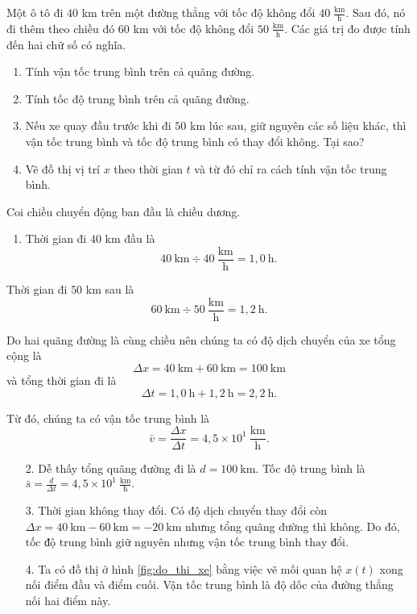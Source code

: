 \documentclass[a4paper, titlepage, openany]{book}
\newcounter{exercise}
\newcounter{solution}
\numberwithin{equation}{chapter}
\begin{document}
\exercise Một ô tô đi $40$ km trên một đường thẳng với tốc độ không đổi $40\;\frac{\text{km}}{\text{h}}$. Sau đó, nó đi thêm theo chiều đó $60$ km với tốc độ không đổi $50\;\frac{\text{km}}{\text{h}}$. Các giá trị đo được tính đến hai chữ số có nghĩa.
\begin{enumerate}
   \item Tính vận tốc trung bình trên cả quãng đường.
   \item Tính tốc độ trung bình trên cả quãng đường.
   \item Nếu xe quay đầu trước khi đi $50$ km lúc sau, giữ nguyên các số liệu khác, thì vận tốc trung bình và tốc độ trung bình có thay đổi không. Tại sao?
   \item Vẽ đồ thị vị trí $x$ theo thời gian $t$ và từ đó chỉ ra cách tính vận tốc trung bình.
\end{enumerate}
\solution

Coi chiều chuyển động ban đầu là chiều dương.

\begin{enumerate}
   \item Thời gian đi $40$ km đầu là $$40\ \text{km}\div 40\ \frac{\text{km}}{\text{h}}=1{,}0\ \text{h}.$$
\end{enumerate}

Thời gian đi $50$ km sau là $$60\ \text{km}\div 50\ \frac{\text{km}}{\text{h}}=1{,}2\ \text{h}.$$

Do hai quãng đường là cùng chiều nên chúng ta có độ dịch chuyển của xe tổng cộng là $$\Delta x=40\ \text{km} + 60\ \text{km} = 100\ \text{km}$$ và tổng thời gian đi là $$\Delta t =1{,}0\ \text{h}+1{,}2\ \text{h}=2{,}2\ \text{h}.$$

Từ đó, chúng ta có vận tốc trung bình là $$\bar{v} = \frac{\Delta x}{\Delta t} =\boxed{4{,}5\times10^1\ \frac{\text{km}}{\text{h}}}.$$

\begin{enumerate}
   \item[2.] Dễ thấy tổng quãng đường đi là $d=100\ \text{km}$. Tốc độ trung bình là $\bar{s} = \frac{d}{\Delta t}=\boxed{4{,}5\times10^1\ \frac{\text{km}}{\text{h}}}.$
   \item[3.] Thời gian không thay đổi. Có độ dịch chuyển thay đổi còn $\Delta x = 40\ \text{km} - 60\ \text{km} = -20\ \text{km}$ nhưng tổng quãng đường thì không. Do đó, $\boxed{\text{tốc độ trung bình giữ nguyên}}$ nhưng $\boxed{\text{vận tốc trung bình thay đổi}}$.
   \item[4.] Ta có đồ thị ở hình \ref{fig:do_thi_xe} bằng việc vẽ mối quan hệ $x(t)$ xong nối điểm đầu và điểm cuối. Vận tốc trung bình là độ dốc của đường thẳng nối hai điểm này.
\end{enumerate}
\end{document}
